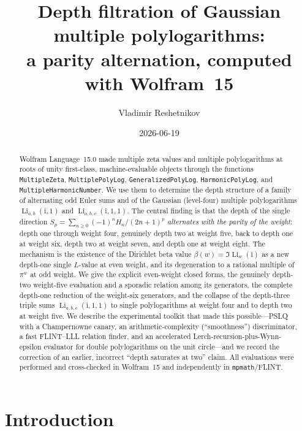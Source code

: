 \documentclass[11pt]{article}
\title{Depth filtration of Gaussian multiple polylogarithms:\\
a parity alternation, computed with Wolfram~15}
\author{Vladimir Reshetnikov}
\date{2026-06-19}
\DeclareMathOperator{\Li}{Li}
\newcommand{\iu}{\mathrm{i}}
\theoremstyle{plain}
\theoremstyle{remark}
\begin{document}
\maketitle

\begin{abstract}
Wolfram Language~15.0 made multiple zeta values and multiple polylogarithms at roots of unity
first-class, machine-evaluable objects through the functions \texttt{MultipleZeta},
\texttt{MultiplePolyLog}, \texttt{GeneralizedPolyLog}, \texttt{HarmonicPolyLog}, and
\texttt{MultipleHarmonicNumber}. We use them to determine the depth structure of a family of
alternating odd Euler sums and of the Gaussian (level-four) multiple polylogarithms
$\Li_{a,b}(\iu,1)$ and $\Li_{a,b,c}(\iu,1,1)$. The central finding is that the depth of the
single direction $S_p=\sum_{n\ge0}(-1)^nH_n/(2n+1)^{p}$ \emph{alternates with the parity of the
weight}: depth one through weight four, genuinely depth two at weight five, back to depth one at
weight six, depth two at weight seven, and depth one at weight eight. The mechanism is the
existence of the Dirichlet beta value $\beta(w)=\Im\Li_w(\iu)$ as a new depth-one single
$L$-value at even weight, and its degeneration to a rational multiple of $\pi^w$ at odd weight.
We give the explicit even-weight closed forms, the genuinely depth-two weight-five evaluation and
a sporadic relation among its generators, the complete depth-one reduction of the weight-six
generators, and the collapse of the depth-three triple sums $\Li_{a,b,c}(\iu,1,1)$ to single
polylogarithms at weight four and to depth two at weight five. We describe the experimental
toolkit that made this possible---PSLQ with a Champernowne canary, an arithmetic-complexity
(``smoothness'') discriminator, a fast FLINT--LLL relation finder, and an accelerated
Lerch-recursion-plus-Wynn-epsilon evaluator for double polylogarithms on the unit circle---and
we record the correction of an earlier, incorrect ``depth saturates at two'' claim. All
evaluations were performed and cross-checked in Wolfram~15 and independently in
\texttt{mpmath}/FLINT.
\end{abstract}

\section{Introduction}
\end{document}
